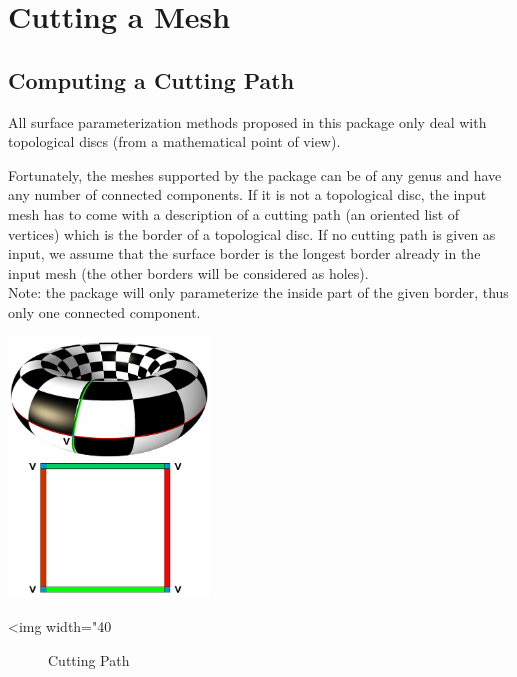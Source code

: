 \section{Cutting a Mesh}
\label{sec:Cutting-a-Mesh}

\subsection{Computing a Cutting Path}

All surface parameterization methods proposed in this package only
deal with topological discs (from a mathematical point of view).

Fortunately, the meshes supported by the package can be of any genus and
have any number of connected components. If it is not a topological
disc, the input mesh has to come with a description of a cutting path (an oriented list of
vertices) which is the border of a topological disc.  If no cutting path is
given as input, we assume that the surface border is the longest border already
in the input mesh (the other borders will be considered as holes). \\
Note: the package will only parameterize the inside part of the given border,
thus only one connected component.

\begin{center}
    \label{Surface_mesh_parameterization-fig-cut}
    \begin{ccTexOnly}
        \includegraphics[width=0.4\textwidth]{Surface_mesh_parameterization/cut} %
    \end{ccTexOnly}
    \begin{ccHtmlOnly}
        <img width="40%
    \end{ccHtmlOnly}
    \begin{figure}[h]
        \caption{Cutting Path}
    \end{figure}
\end{center}

